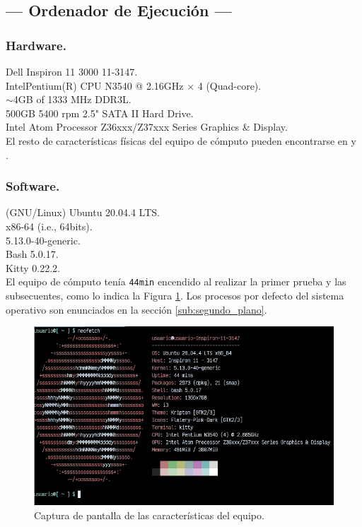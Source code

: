 \documentclass[11pt,a4paper]{article}
\begin{document}
\subsection{--- Ordenador de Ejecución ---} %
\label{sub:condiciones}
\begin{minipage}{0.5\linewidth}
	\subsubsection{Hardware.} %
	\label{subs:hardware}
	\ttfamily
	 Dell Inspiron 11 3000 11-3147. \\[2mm]
	 Intel\textregistered Pentium(R) CPU N3540 @ 2.16GHz × 4 (Quad-core). \\[2mm]
	 \(\sim\)4GB of 1333 MHz DDR3L. \\[2mm]
	 500GB 5400 rpm 2.5" SATA II Hard Drive. \\[2mm]
	 Intel Atom Processor Z36xxx/Z37xxx Series Graphics \& Display. \\[2mm]
	\normalfont
	El resto de características físicas del equipo de cómputo pueden encontrarse en  y .
\end{minipage}\hspace{5mm}
\begin{minipage}{0.5\linewidth}
	\subsubsection{Software.} %
	\label{subs:software}
	\ttfamily
	 (GNU/Linux) Ubuntu 20.04.4 LTS.\\[2mm]
	 x86-64 (i.e., 64bits).\\[2mm]
	 5.13.0-40-generic.\\[2mm]
	 Bash 5.0.17.\\[2mm]
	 Kitty 0.22.2.\\[2mm]
	\normalfont
	El equipo de cómputo tenía \texttt{44min} encendido al realizar la primer prueba y las subsecuentes, como lo indica la Figura \ref{fig:caract}.
	Los procesos por defecto del sistema operativo son enunciados en la sección \ref{sub:segundo_plano}.
\end{minipage}
\newpage
\begin{figure}[hbt!]
	\centering
	\includegraphics[width= 0.8 \linewidth]{IMAGENES/1/caracteristicas_equipo.png}
	\caption{Captura de pantalla de las características del equipo.}
	\label{fig:caract}
\end{figure}
\end{document}
